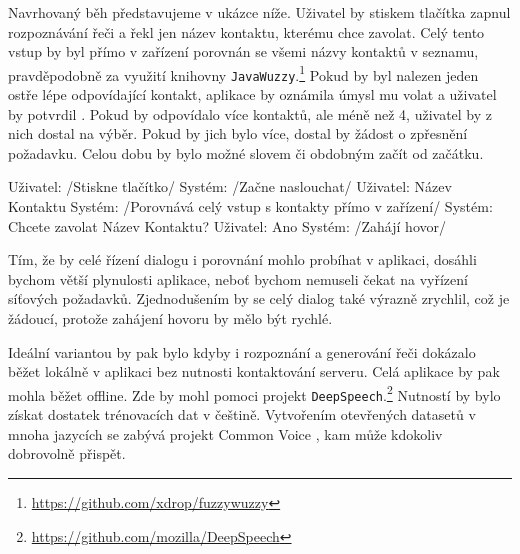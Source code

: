 Navrhovaný běh představujeme v ukázce níže. Uživatel by stiskem
tlačítka zapnul rozpoznávání řeči a řekl jen název kontaktu,
kterému chce zavolat. Celý tento vstup by byl přímo v zařízení
porovnán se všemi názvy kontaktů v seznamu, pravděpodobně za
využití knihovny \texttt{JavaWuzzy}.\footnote{\url{https://github.com/xdrop/fuzzywuzzy}} Pokud by byl
nalezen jeden ostře lépe odpovídající kontakt, aplikace
by oznámila úmysl mu volat a uživatel by potvrdil .
Pokud by odpovídalo více kontaktů, ale méně než 4, uživatel
by z nich dostal na výběr. Pokud by jich bylo více, dostal by
žádost o zpřesnění požadavku. Celou dobu by bylo možné slovem
 či obdobným začít od začátku.
\begin{code}
    Uživatel: /Stiskne tlačítko/
    Systém:   /Začne naslouchat/
    Uživatel: Název Kontaktu
    Systém:   /Porovnává celý vstup s kontakty přímo v zařízení/
    Systém:   Chcete zavolat Název Kontaktu?
    Uživatel: Ano
    Systém:   /Zahájí hovor/
\end{code}

Tím, že by celé řízení dialogu i porovnání mohlo probíhat v aplikaci,
dosáhli bychom větší plynulosti aplikace, neboť bychom nemuseli čekat
na vyřízení síťových požadavků. Zjednodušením by se celý dialog také
výrazně zrychlil, což je žádoucí, protože zahájení hovoru by mělo
být rychlé.

Ideální variantou by pak bylo kdyby i rozpoznání a generování řeči
dokázalo běžet lokálně v aplikaci bez nutnosti kontaktování serveru.
Celá aplikace by pak mohla běžet offline. Zde by mohl pomoci projekt
\texttt{DeepSpeech}.\footnote{\url{https://github.com/mozilla/DeepSpeech}}
Nutností by bylo získat dostatek trénovacích dat v češtině. Vytvořením
otevřených datasetů v mnoha jazycích se zabývá projekt Common Voice \citep{commonvoice_2020},
kam může kdokoliv dobrovolně přispět.